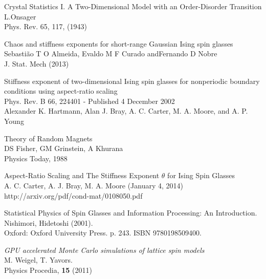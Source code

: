 \documentclass[paper=a4, fontsize=11pt]{scrartcl} %
\numberwithin{equation}{section} %
\numberwithin{figure}{section} %
\numberwithin{table}{section} %
\begin{document}
\pagebreak

\begin{thebibliography}{100}

Crystal Statistics I. A Two-Dimensional Model with an Order-Disorder Transition \\
L.Onsager \\
Phys. Rev. 65, 117, (1943)

Chaos and stiffness exponents for short-range Gaussian Ising spin glasses \\
Sebasti\~{a}o T O Almeida, Evaldo M F Curado andFernando D Nobre \\
J. Stat. Mech (2013)

Stiffness exponent of two-dimensional Ising spin glasses for nonperiodic boundary conditions using aspect-ratio scaling \\
Phys. Rev. B 66, 224401 - Published 4 December 2002 \\
Alexander K. Hartmann, Alan J. Bray, A. C. Carter, M. A. Moore, and A. P. Young

Theory of Random Magnets \\
DS Fisher, GM Grinstein, A Khurana \\
Physics Today, 1988 

Aspect-Ratio Scaling and The Stiffness Exponent $\theta$ for Ising Spin Glasses \\
A. C. Carter, A. J. Bray, M. A. Moore (January 4, 2014) \\
http://arxiv.org/pdf/cond-mat/0108050.pdf

Statistical Physics of Spin Glasses and Information Processing: An Introduction. \\
Nishimori, Hidetoshi (2001). \\
Oxford: Oxford University Press. p. 243. ISBN 9780198509400.

\textit{GPU accelerated Monte Carlo simulations of lattice spin models} \\
M. Weigel, T. Yavors. \\
Physics Procedia, \textbf{15} (2011)

\end{thebibliography}
\end{document}
